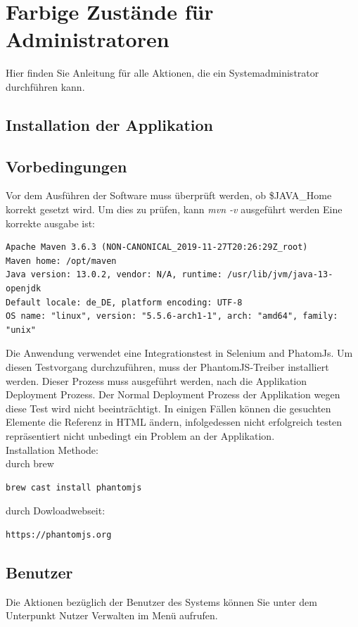 \documentclass[enabledeprecatedfontcommands,fontsize=12pt,paper=a4,twoside]{scrartcl}
\begin{document}

\clearpage
\section{Farbige Zustände für Administratoren}
Hier finden Sie Anleitung für alle Aktionen, die ein Systemadministrator durchführen kann. 
\subsection{Installation der Applikation}
\subsection{Vorbedingungen}
Vor dem Ausführen der Software muss überprüft werden, ob \$JAVA\_Home korrekt gesetzt wird.
Um dies zu prüfen, kann \textit{mvn -v} ausgeführt werden
Eine korrekte ausgabe ist:
\begin{verbatim}
Apache Maven 3.6.3 (NON-CANONICAL_2019-11-27T20:26:29Z_root)
Maven home: /opt/maven
Java version: 13.0.2, vendor: N/A, runtime: /usr/lib/jvm/java-13-openjdk
Default locale: de_DE, platform encoding: UTF-8
OS name: "linux", version: "5.5.6-arch1-1", arch: "amd64", family: "unix"
\end{verbatim}

Die Anwendung verwendet eine Integrationstest in Selenium and PhatomJs. Um diesen Testvorgang durchzuführen, muss der PhantomJS-Treiber installiert werden. Dieser Prozess muss ausgeführt werden, nach die Applikation Deployment Prozess. Der Normal Deployment Prozess der Applikation wegen diese Test wird nicht beeinträchtigt. In einigen Fällen können die gesuchten Elemente die Referenz in HTML ändern, infolgedessen nicht erfolgreich testen repräsentiert nicht unbedingt ein Problem an der Applikation.\\

Installation Methode:\\
durch brew
\begin{verbatim}
brew cast install phantomjs
\end{verbatim}
durch Dowloadwebseit:
\begin{verbatim}
https://phantomjs.org
\end{verbatim}
\subsection{Benutzer}
Die Aktionen bezüglich der Benutzer des Systems können Sie unter dem Unterpunkt Nutzer Verwalten im Menü aufrufen. \\
\end{document}
